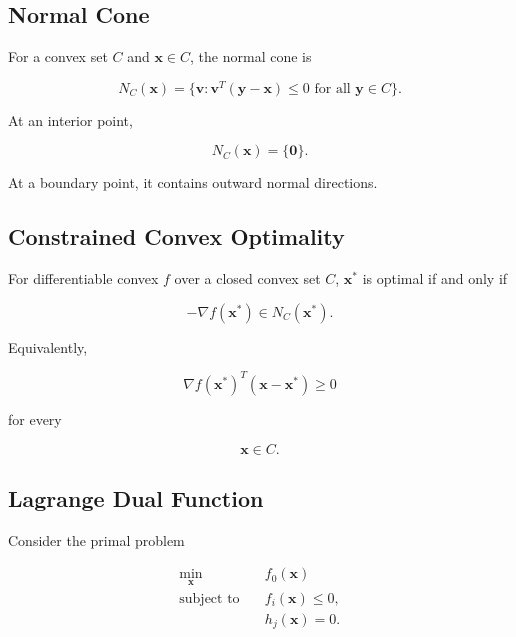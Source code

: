\subsection{Normal Cone}
\label{subsec:normal-cone-convex}

For a convex set \(C\) and \(\mathbf{x}\in C\), the normal cone is

\[
\boxed{
N_C(\mathbf{x})
=
\{
\mathbf{v}:
\mathbf{v}^T
(
\mathbf{y}-\mathbf{x}
)
\leq0
\text{ for all }
\mathbf{y}\in C
\}.
}
\]

At an interior point,

\[
\boxed{
N_C(\mathbf{x})=\{\mathbf{0}\}.
}
\]

At a boundary point, it contains outward normal directions.

\subsection{Constrained Convex Optimality}
\label{subsec:constrained-convex-optimality}

For differentiable convex \(f\) over a closed convex set \(C\),
\(\mathbf{x}^*\) is optimal if and only if

\[
\boxed{
-\nabla f(\mathbf{x}^*)
\in
N_C(\mathbf{x}^*).
}
\]

Equivalently,

\[
\boxed{
\nabla f(\mathbf{x}^*)^T
(
\mathbf{x}-\mathbf{x}^*
)
\geq0
}
\]

for every

\[
\mathbf{x}\in C.
\]

\subsection{Lagrange Dual Function}
\label{subsec:convex-lagrange-dual-function}

Consider the primal problem

\[
\boxed{
\begin{aligned}
\min_{\mathbf{x}}
\quad&
f_0(\mathbf{x})
\\
\text{subject to}
\quad&
f_i(\mathbf{x})\leq0,
\\
&
h_j(\mathbf{x})=0.
\end{aligned}
}
\]

